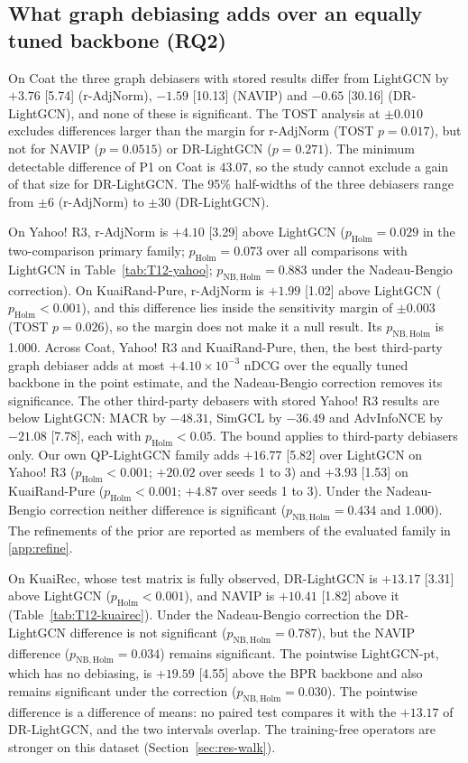 \subsection{What graph debiasing adds over an equally tuned backbone (RQ2)}\label{sec:res-debias}

On Coat the three graph debiasers with stored results differ from LightGCN by $+3.76$ [5.74] (r-AdjNorm), $-1.59$
[10.13] (NAVIP) and $-0.65$ [30.16] (DR-LightGCN), and none of these is significant. The TOST analysis at $\pm0.010$
excludes differences larger than the margin for r-AdjNorm (TOST $p=0.017$), but not for NAVIP ($p=0.0515$) or
DR-LightGCN ($p=0.271$). The minimum detectable difference of P1 on Coat is $43.07$, so the study cannot exclude a gain
of that size for DR-LightGCN. The 95\% half-widths of the three debiasers range from $\pm6$ (r-AdjNorm) to $\pm30$
(DR-LightGCN).

On Yahoo! R3, r-AdjNorm is $+4.10$ [3.29] above LightGCN ($p_\mathrm{Holm}=0.029$ in the two-comparison primary family;
$p_\mathrm{Holm}=0.073$ over all comparisons with LightGCN in Table~\ref{tab:T12-yahoo}; $p_\mathrm{NB,Holm}=0.883$ under
the Nadeau-Bengio correction). On KuaiRand-Pure, r-AdjNorm is $+1.99$ [1.02] above LightGCN ($p_\mathrm{Holm}<0.001$),
and this difference lies inside the sensitivity margin of $\pm0.003$ (TOST $p=0.026$), so the margin does not make it
a null result. Its $p_\mathrm{NB,Holm}$ is 1.000. Across Coat, Yahoo! R3 and KuaiRand-Pure, then, the best third-party
graph debiaser adds at most $+4.10\times10^{-3}$ nDCG over the equally tuned backbone in the point estimate, and the
Nadeau-Bengio correction removes its significance. The other third-party debasers with stored Yahoo! R3 results are
below LightGCN: MACR by $-48.31$, SimGCL by $-36.49$ and AdvInfoNCE by $-21.08$ [7.78], each with $p_\mathrm{Holm}<0.05$.
The bound applies to third-party debiasers only. Our own QP-LightGCN family adds $+16.77$ [5.82] over LightGCN on
Yahoo! R3 ($p_\mathrm{Holm}<0.001$; $+20.02$ over seeds 1 to 3) and $+3.93$ [1.53] on KuaiRand-Pure ($p_\mathrm{Holm}<0.001$;
$+4.87$ over seeds 1 to 3). Under the Nadeau-Bengio correction neither difference is significant ($p_\mathrm{NB,Holm}=0.434$
and $1.000$). The refinements of the prior are reported as members of the evaluated family in \ref{app:refine}.

On KuaiRec, whose test matrix is fully observed, DR-LightGCN is $+13.17$ [3.31] above LightGCN ($p_\mathrm{Holm}<0.001$),
and NAVIP is $+10.41$ [1.82] above it (Table~\ref{tab:T12-kuairec}). Under the Nadeau-Bengio correction the
DR-LightGCN difference is not significant ($p_\mathrm{NB,Holm}=0.787$), but the NAVIP difference ($p_\mathrm{NB,Holm}=0.034$)
remains significant. The pointwise LightGCN-pt, which has no debiasing, is $+19.59$ [4.55] above the BPR backbone and
also remains significant under the correction ($p_\mathrm{NB,Holm}=0.030$). The pointwise difference is a difference of
means: no paired test compares it with the $+13.17$ of DR-LightGCN, and the two intervals overlap. The training-free
operators are stronger on this dataset (Section~\ref{sec:res-walk}).

